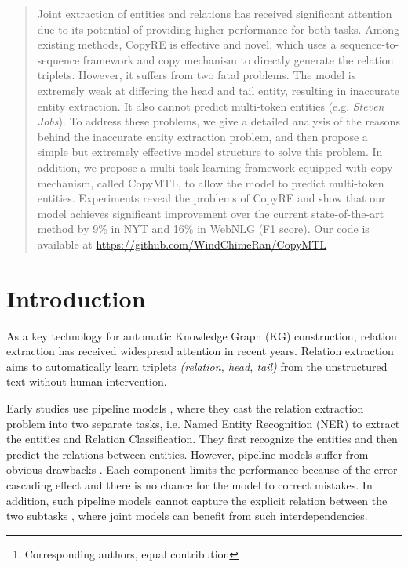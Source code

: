 \documentclass[letterpaper]{article} \usepackage{aaai20}  \usepackage{times}  \usepackage{helvet} \usepackage{courier}  \usepackage[hyphens]{url}  \usepackage{graphicx}
\author{Daojian Zeng\thanks{Corresponding authors, equal contribution}\textsuperscript{\rm $\S$}, Ranran Haoran Zhang\footnotemark[1]\textsuperscript{\rm $\dagger$} , \Large Qianying Liu\textsuperscript{\rm $\ddagger$}\\ \textsuperscript{\rm $\S$}Changsha University of Science \& Technology, Changsha, 410114, China\\ \textsuperscript{\rm $\dagger$}University of Illinois at Urbana-Champaign, Illinois, 61820, USA\\ \textsuperscript{\rm $\ddagger$}Kyoto University, Kyoto, 606-8501, Japan\\
	\url{zengdj916@163.com}, \ \url{haoranz6@illinois.edu}, \ \url{ying@nlp.ist.i.kyoto-u.ac.jp}
}
\begin{document}
\maketitle

\begin{abstract}
Joint extraction of entities and relations has received significant attention due to its potential of providing higher performance for both tasks. Among existing methods, 
CopyRE is effective and novel, which uses a sequence-to-sequence framework and copy mechanism to directly generate the relation triplets.
However, it suffers from two fatal problems. The model is extremely weak at differing the head and tail entity, resulting in inaccurate entity extraction. It also cannot predict multi-token entities (e.g. \textit{Steven Jobs}). To address these problems, we give a detailed analysis of the reasons behind the inaccurate entity extraction problem, and then propose a simple but extremely effective model structure to solve this problem. In addition, we propose a multi-task learning framework equipped with copy mechanism, called CopyMTL, to allow the model to predict multi-token entities. Experiments reveal the problems of CopyRE and show that our model achieves significant improvement over the current state-of-the-art method by 9\% in NYT and 16\% in WebNLG (F1 score). Our code is available at \url{https://github.com/WindChimeRan/CopyMTL}

\end{abstract}

  \section{Introduction}
  \label{sec:intro}




  As a key technology for automatic Knowledge Graph (KG) construction, relation extraction has received widespread attention in recent years. Relation extraction aims to automatically learn triplets \textit{(relation, head, tail)} from the unstructured text without human intervention.

  Early studies use pipeline models \cite{pipeline1,pipeline2}, where they cast the relation extraction problem into two separate tasks, i.e. Named Entity Recognition (NER) to extract the entities and Relation Classification. 
  They first recognize the entities and then predict the relations between entities.
  However, pipeline models suffer from obvious drawbacks \cite{linear_programming}. Each component limits the performance because of the error cascading effect and there is no chance for the model to correct mistakes. In addition, such pipeline models cannot capture the explicit relation between the two subtasks \cite{interaction}, where joint models can benefit from such interdependencies.
  
\end{document}
